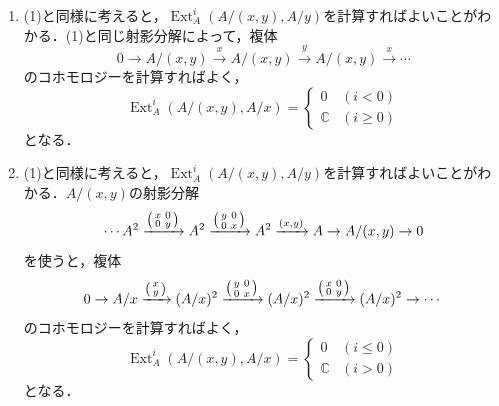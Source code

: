 \documentclass[uplatex,a4paper,11pt,dvipdfmx]{jsarticle}
\makeatletter
\theoremstyle{mystyle} %
\renewenvironment{proof}[1][\proofname]{\par
 \pushQED{\qed}%
 \normalfont \topsep6\p@\@plus6\p@\relax
 \trivlist
 \item[\hskip\labelsep
 \itshape
 {\bf\underline{#1}}]\ignorespaces
}{%
 \popQED\endtrivlist\@endpefalse
}
\newenvironment{sumipmatrix}{\left ( \begin{smallmatrix}} {\end{smallmatrix}\right )}
\DeclareMathOperator{\Ext}{Ext}
\makeatother
\begin{document}
\begin{proof}
\begin{enumerate}
		\item (1)と同様に考えると，$\Ext^i_A(A/(x, y), A/y)$を計算すればよいことがわかる．(1)と同じ射影分解によって，複体$$0 \to A/(x,y) \xrightarrow{x} A/(x,y)\xrightarrow{y} A/(x,y)\xrightarrow{x
			      } \cdots$$のコホモロジーを計算すればよく，$$ \Ext^i_A(A/(x,y), A/x) = \left \{
			      \begin{array}{ll}
				      0          & (i< 0)    \\
				      \mathbb{C} & (i\geq 0)
			      \end{array}
			      \right.$$となる．
		\item (1)と同様に考えると，$\Ext^i_A(A/(x, y), A/y)$を計算すればよいことがわかる．$A/(x,y)$の射影分解
		      $$\cdots A^2\xrightarrow{\begin{sumipmatrix}
					      x & 0 \\
					      0 & y \\
				      \end{sumipmatrix}
			      }A^2\xrightarrow{\begin{sumipmatrix}
					      y & 0 \\
					      0 & x \\
				      \end{sumipmatrix}
			      } A^2 \xrightarrow{(x,y)} A \to A/(x,y)\to 0
		      $$を使うと，複体$$0 \to A/x \xrightarrow{\begin{sumipmatrix}
					      x \\
					      y \\
				      \end{sumipmatrix}
			      } (A/x)^2\xrightarrow{\begin{sumipmatrix}
					      y & 0 \\
					      0 & x \\
				      \end{sumipmatrix}
			      } (A/x)^2 \xrightarrow{\begin{sumipmatrix}
					      x & 0 \\
					      0 & y \\
				      \end{sumipmatrix}
			      } (A/x)^2 \to \cdots$$のコホモロジーを計算すればよく，$$ \Ext^i_A(A/(x,y), A/x) = \left \{
			      \begin{array}{ll}
				      0          & (i\leq 0) \\
				      \mathbb{C} & (i>0)
			      \end{array}
			      \right.$$となる．
	\end{enumerate}
\end{proof}
\end{document}
